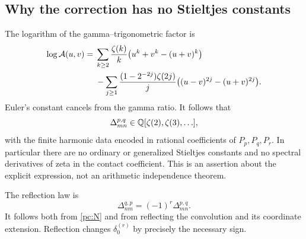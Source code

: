 \subsection{Why the correction has no Stieltjes constants}
The logarithm of the gamma--trigonometric factor is
\begin{align}\label{pc:logA}
 \log\mathcal A(u,v)={}&\sum_{k\ge2}\frac{\zeta(k)}k
               \bigl(u^k+v^k-(u+v)^k\bigr)\notag\\
 &-\sum_{j\ge1}\frac{(1-2^{-2j})\zeta(2j)}j
               \bigl((u-v)^{2j}-(u+v)^{2j}\bigr).
\end{align}
Euler's constant cancels from the gamma ratio. It follows that
\[
 \Delta_{mn}^{p,q}\in\mathbb{Q}[\zeta(2),\zeta(3),\ldots],
\]
with the finite harmonic data encoded in rational coefficients of $P_p,P_q,P_r$. In particular there are no ordinary or generalized Stieltjes constants and no spectral derivatives of zeta in the contact coefficient. This is an assertion about the explicit expression, not an arithmetic independence theorem.

The reflection law is
\begin{equation}\label{pc:reflection}
 \Delta_{nm}^{q,p}=(-1)^r\Delta_{mn}^{p,q}.
\end{equation}
It follows both from \eqref{pc:N} and from reflecting the convolution and its coordinate extension. Reflection changes $\delta_0^{(r)}$ by precisely the necessary sign.

